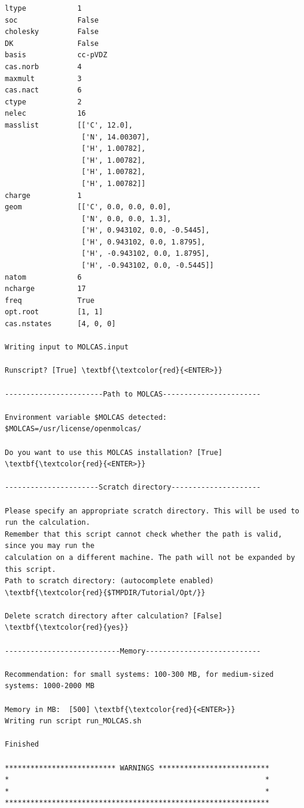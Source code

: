 \documentclass[a4paper,11pt,DIV=15,openany]{scrbook}
\begin{document}
\begin{oframed}
\begin{Verbatim}[commandchars=\\\{\}]
ltype            1
soc              False
cholesky         False
DK               False
basis            cc-pVDZ
cas.norb         4
maxmult          3
cas.nact         6
ctype            2
nelec            16
masslist         [['C', 12.0], 
                  ['N', 14.00307], 
                  ['H', 1.00782], 
                  ['H', 1.00782], 
                  ['H', 1.00782], 
                  ['H', 1.00782]]
charge           1
geom             [['C', 0.0, 0.0, 0.0], 
                  ['N', 0.0, 0.0, 1.3], 
                  ['H', 0.943102, 0.0, -0.5445], 
                  ['H', 0.943102, 0.0, 1.8795], 
                  ['H', -0.943102, 0.0, 1.8795], 
                  ['H', -0.943102, 0.0, -0.5445]]
natom            6
ncharge          17
freq             True
opt.root         [1, 1]
cas.nstates      [4, 0, 0]

Writing input to MOLCAS.input

Runscript? [True] \textbf{\textcolor{red}{<ENTER>}}

-----------------------Path to MOLCAS-----------------------

Environment variable $MOLCAS detected:
$MOLCAS=/usr/license/openmolcas/

Do you want to use this MOLCAS installation? [True] \textbf{\textcolor{red}{<ENTER>}}

----------------------Scratch directory---------------------

Please specify an appropriate scratch directory. This will be used to run the calculation. 
Remember that this script cannot check whether the path is valid, since you may run the 
calculation on a different machine. The path will not be expanded by this script.
Path to scratch directory: (autocomplete enabled) \textbf{\textcolor{red}{$TMPDIR/Tutorial/Opt/}}

Delete scratch directory after calculation? [False] \textbf{\textcolor{red}{yes}}

---------------------------Memory---------------------------

Recommendation: for small systems: 100-300 MB, for medium-sized systems: 1000-2000 MB

Memory in MB:  [500] \textbf{\textcolor{red}{<ENTER>}}
Writing run script run_MOLCAS.sh

Finished

************************** WARNINGS **************************
*                                                            *
*                                                            *
**************************************************************
\end{Verbatim}
\end{oframed}
\end{document}
